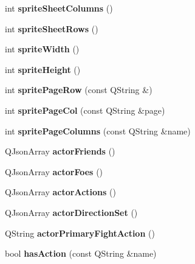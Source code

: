 \begin{DoxyCompactItemize}
int {\bfseries sprite\+Sheet\+Columns} ()
\item 
\mbox{\label{class_asset_manager_ae7df2f180d987957d1b28959ba39643d}} 
int {\bfseries sprite\+Sheet\+Rows} ()
\item 
\mbox{\label{class_asset_manager_aa3161c0ad9ac8dbab9d8732a47335f22}} 
int {\bfseries sprite\+Width} ()
\item 
\mbox{\label{class_asset_manager_ab800356c8b05a8fed62e522a3cea11d9}} 
int {\bfseries sprite\+Height} ()
\item 
\mbox{\label{class_asset_manager_a716db89db2e5cf1405d3cf3906f581b7}} 
int {\bfseries sprite\+Page\+Row} (const Q\+String \&)
\item 
\mbox{\label{class_asset_manager_a554a984f9edbac3fd4b2a52e983ea74d}} 
int {\bfseries sprite\+Page\+Col} (const Q\+String \&page)
\item 
\mbox{\label{class_asset_manager_abe76754e3b6a55d19969772a12dd42f8}} 
int {\bfseries sprite\+Page\+Columns} (const Q\+String \&name)
\item 
\mbox{\label{class_asset_manager_a577dacd1b7f1631f808fe7c68c4638de}} 
Q\+Json\+Array {\bfseries actor\+Friends} ()
\item 
\mbox{\label{class_asset_manager_ac0d791cc43c7dd68fd8ff43fb69a3619}} 
Q\+Json\+Array {\bfseries actor\+Foes} ()
\item 
\mbox{\label{class_asset_manager_a98e88dbd0bdc8e409d13815556071a2a}} 
Q\+Json\+Array {\bfseries actor\+Actions} ()
\item 
\mbox{\label{class_asset_manager_afbd4c4a3edfef4a4d7fe68e1a1953a2c}} 
Q\+Json\+Array {\bfseries actor\+Direction\+Set} ()
\item 
\mbox{\label{class_asset_manager_ab114e7886b4de3519590f913f508706a}} 
Q\+String {\bfseries actor\+Primary\+Fight\+Action} ()
\item 
\mbox{\label{class_asset_manager_a2c2b23679fe2e0e736e12beeaae99198}} 
bool {\bfseries has\+Action} (const Q\+String \&name)
\end{DoxyCompactItemize}
